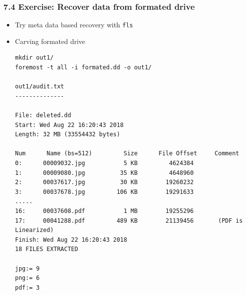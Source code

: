 \begin{frame}[fragile]
  \frametitle{7.4 Exercise: Recover data from formated drive}
    \begin{itemize}
	\item Try meta data based recovery with \texttt{fls}
        \item Carving formated drive
        \begin{lstlisting}[basicstyle=\tiny]
mkdir out1/
foremost -t all -i formated.dd -o out1/

out1/audit.txt
--------------

File: deleted.dd
Start: Wed Aug 22 16:20:43 2018
Length: 32 MB (33554432 bytes)

Num      Name (bs=512)         Size      File Offset     Comment
0:      00009032.jpg           5 KB         4624384
1:      00009080.jpg          35 KB         4648960
2:      00037617.jpg          30 KB        19260232
3:      00037678.jpg         106 KB        19291633
.....
16:     00037608.pdf           1 MB        19255296
17:     00041288.pdf         489 KB        21139456       (PDF is Linearized)
Finish: Wed Aug 22 16:20:43 2018
18 FILES EXTRACTED

jpg:= 9
png:= 6
pdf:= 3
        \end{lstlisting}
    \end{itemize}
\end{frame}


